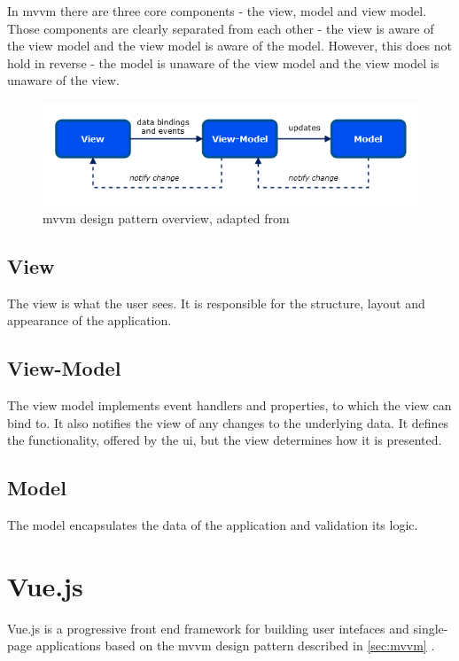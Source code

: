 In \gls{mvvm} there are three core components - the view, model and view model. Those components are clearly separated from each other - the view is aware of the view model and the view model is aware of the model. However, this does not hold in reverse - the model is unaware of the view model and the view model is unaware of the view. 

\begin{figure}[H]
  \includegraphics[width=\textwidth]{images/mvvm.png}
   \caption{\gls{mvvm} design pattern overview, adapted from \parencite[7]{microsoft_mvvm}}
   \label{fig:mvvm}
 \end{figure}

\subsection{View}
The view is what the user sees. It is responsible for the structure, layout and appearance of the application.
\subsection{View-Model}
The view model implements event handlers and properties, to which the view can bind to. It also notifies the view of any changes to the underlying data. It defines the functionality, offered by the \gls{ui}, but the view determines how it is presented. 
\subsection{Model}
The model encapsulates the data of the application and validation its logic.


\section{Vue.js}

Vue.js \parencite{vuejs_gh} is a progressive front end framework for building user intefaces and single-page applications based on the \gls{mvvm} design pattern described in \ref{sec:mvvm} \parencite{vuejs_book} \parencite{vuejs_guide}.  

